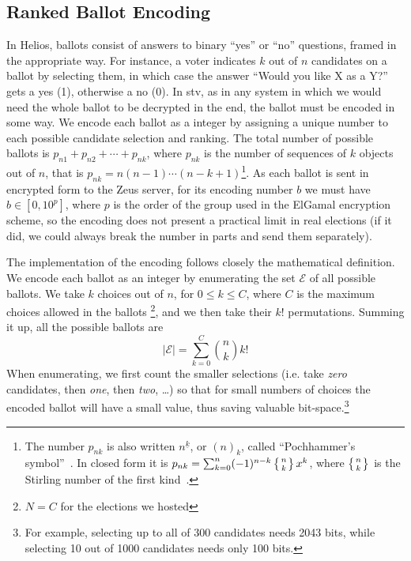 \documentclass[letterpaper,10pt]{article}
\begin{document}
\subsection{Ranked Ballot Encoding}
\label{sec:ballot_encoding}
In Helios, ballots consist of answers to binary ``yes'' or ``no''
questions, framed in the appropriate way. For instance, a voter
indicates $k$ out of $n$ candidates on a ballot by selecting them, in
which case the answer ``Would you like X as a Y?'' gets a yes (1),
otherwise a no (0). In {\sc stv}, as in any system in which we would need
the whole ballot to be decrypted in the end, the ballot must be
encoded in some way. We encode each ballot as a integer by assigning a
unique number to each possible candidate selection and ranking. The
total number of possible ballots is $p _{n1} + p_{n2} + \cdots + p
_{nk}$, where $p_{nk}$ is the number of sequences of $k$ objects out
of $n$, that is $p_{nk} = n(n - 1)\cdots(n - k + 1)$\footnote{The
  number $p_{nk}$ is also written $n^{\underline{k}}$, or $(n)_k$,
  called ``Pochhammer's symbol''~\cite[p.\ 48]{graham:1994}. In closed
  form it is $p_{nk} = \sum_{k=0}^{n} (-1)^{n-k}\left\{n \atop
    k\right\}x^k$, where $\left\{n \atop k\right\}$ is the Stirling
  number of the first kind~\cite{weisstein:pochhammer}.}. As each
ballot is sent in encrypted form to the Zeus server, for its encoding
number $b$ we must have $b \in [0, 10^p]$, where $p$ is the order of
the group used in the ElGamal encryption scheme, so the encoding does
not present a practical limit in real elections (if it did, we could
always break the number in parts and send them separately).

The implementation of the encoding follows closely the mathematical
definition. We encode each ballot as an integer by enumerating the set
$\mathcal{E}$ of all possible ballots. We take $k$ choices out of $n$,
for $0\leq k \leq C$, where $C$ is the maximum choices allowed in the
ballots \footnote{$N=C$ for the elections we hosted}, and we then take
their $k!$ permutations. Summing it up, all the possible ballots are
\begin{equation}
\label{eq:max_encoded}
|\mathcal{E}| = \sum^{C}_{k=0}\binom{n}{k}k!
\end{equation}
When enumerating, we first count the smaller selections (i.e. take
\textit{zero} candidates, then \textit{one}, then \textit{two},
\ldots) so that for small numbers of choices the encoded ballot will
have a small value, thus saving valuable bit-space.\footnote{ For
  example, selecting up to all of 300 candidates needs 2043 bits,
  while selecting 10 out of 1000 candidates needs only 100 bits.}
\end{document}
